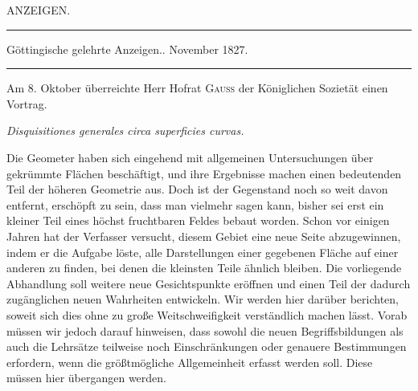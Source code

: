 \begin{center}
\Large ANZEIGEN.\par\medskip
\normalsize\rule{.85\textwidth}{.3pt}\par
Göttingische gelehrte Anzeigen.. November 1827.\par
\rule{.85\textwidth}{.3pt}
\end{center}
\hspace*{\parindent}Am 8. Oktober überreichte Herr Hofrat \textsc{Gauss} der Königlichen Sozietät einen Vortrag.
\begin{center}\textit{Disquisitiones generales circa superficies curvas.}\end{center}
\hspace*{\parindent}Die Geometer haben sich eingehend mit allgemeinen Untersuchungen über gekrümmte Flächen beschäftigt, und ihre Ergebnisse machen einen bedeutenden Teil der höheren Geometrie aus. Doch ist der Gegenstand noch so weit davon entfernt, erschöpft zu sein, dass man vielmehr sagen kann, bisher sei erst ein kleiner Teil eines höchst fruchtbaren Feldes bebaut worden. Schon vor einigen Jahren hat der Verfasser versucht, diesem Gebiet eine neue Seite abzugewinnen, indem er die Aufgabe löste, alle Darstellungen einer gegebenen Fläche auf einer anderen zu finden, bei denen die kleinsten Teile ähnlich bleiben. Die vorliegende Abhandlung soll weitere neue Gesichtspunkte eröffnen und einen Teil der dadurch zugänglichen neuen Wahrheiten entwickeln. Wir werden hier darüber berichten, soweit sich dies ohne zu große Weitschweifigkeit verständlich machen lässt. Vorab müssen wir jedoch darauf hinweisen, dass sowohl die neuen Begriffsbildungen als auch die Lehrsätze teilweise noch Einschränkungen oder genauere Bestimmungen erfordern, wenn die größtmögliche Allgemeinheit erfasst werden soll. Diese müssen hier übergangen werden.
